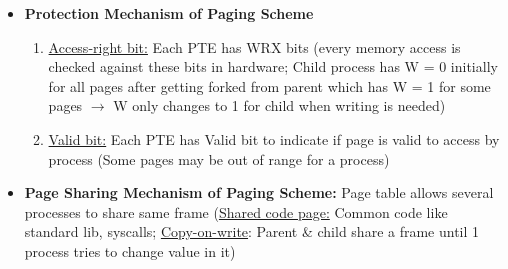 \documentclass[landscape]{article}
\begin{document}
\begin{multicols*}{6}
\begin{itemize}
\begin{itemize}
      \end{itemize}
      \item \textbf{Protection Mechanism of Paging Scheme}
      \begin{enumerate}
        \item \underline{Access-right bit:} Each PTE has WRX bits (every memory access is checked against these bits in hardware; Child process has W = 0 initially for all pages after getting forked from parent which has W = 1 for some pages $\rightarrow$ W only changes to 1 for child when writing is needed)
        \item \underline{Valid bit:} Each PTE has Valid bit to indicate if page is valid to access by process (Some pages may be out of range for a process)
      \end{enumerate}
      \item \textbf{Page Sharing Mechanism of Paging Scheme:} Page table allows several processes to share same frame (\underline{Shared code page:} Common code like standard lib, syscalls; \underline{Copy-on-write}: Parent \& child share a frame until 1 process tries to change value in it)
    \end{itemize}


\end{multicols*}
\end{document}
